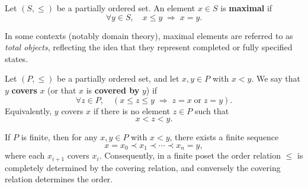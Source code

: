 
\begin{definition}
Let $(S,\le)$ be a partially ordered set. An element $x \in S$ is \textbf{maximal} if
\[
\forall y \in S, \quad x \le y \;\Longrightarrow\; x = y.
\]
\end{definition}

\begin{remark}[Terminology]
In some contexts (notably domain theory), maximal elements are referred to as \emph{total objects}, reflecting the idea that they represent completed or fully specified states.
\end{remark}
































\begin{definition}
Let $(P,\le)$ be a partially ordered set, and let $x,y \in P$ with $x < y$. We say that $y$ \textbf{covers} $x$ (or that $x$ is \textbf{covered by} $y$) if
\[
\forall z \in P, \quad (x \le z \le y \;\Longrightarrow\; z = x \;\text{or}\; z = y).
\]
Equivalently, $y$ covers $x$ if there is no element $z \in P$ such that
\[
x < z < y.
\]
\end{definition}

\begin{remark}
If $P$ is finite, then for any $x,y \in P$ with $x < y$, there exists a finite sequence
\[
x = x_0 \prec x_1 \prec \cdots \prec x_n = y,
\]
where each $x_{i+1}$ covers $x_i$. Consequently, in a finite poset the order relation $\le$ is completely determined by the covering relation, and conversely the covering relation determines the order.
\end{remark}

